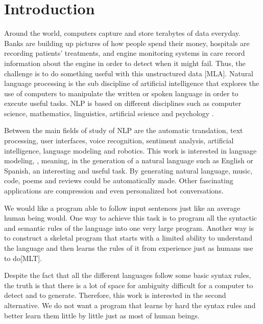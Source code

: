 \chapter{Introduction}
\label{ch:intro}

Around the world, computers capture and store terabytes of data everyday. Banks are building up pictures of how people spend their money, hospitals are recording patients' treatments, and engine monitoring systems in care record information about the engine in order to detect when it might fail. Thus, the challenge is to do something useful with this unstructured data [MLA].  Natural language processing is the sub discipline of artificial intelligence that explores the use of computers to manipulate the written or spoken language in order to execute useful tasks. NLP is based on different disciplines such as computer science, mathematics, linguistics, artificial science and psychology \cite{chowdhury2003natural}.

Between the main fields of study of NLP are the automatic translation, text processing, user interfaces, voice recognition, sentiment analysis, artificial intelligence, language modeling and robotics. This work is interested in  language modeling, , meaning, in the generation of a natural language such as English or Spanish, an interesting and useful task. By generating natural language, music, code, poems and reviews could be automatically made. Other fascinating applications are compression and even personalized bot conversations. 

We would like a program able to follow input sentences just like an average human being would. One way to achieve this task is to program all the syntactic and semantic rules of the language into one very large program. Another way is to construct a skeletal program that starts with a limited ability to understand the language and then learns the rules of it from experience just as humans use to do[MLT].  

Despite the fact that all the different languages follow some basic syntax rules, the truth is that there is a lot of space for ambiguity difficult for a computer to detect and to generate.  Therefore, this work is interested in the second alternative. We do not want a program that learns by hard the syntax rules and better learn them little by little just as most of human beings. 

